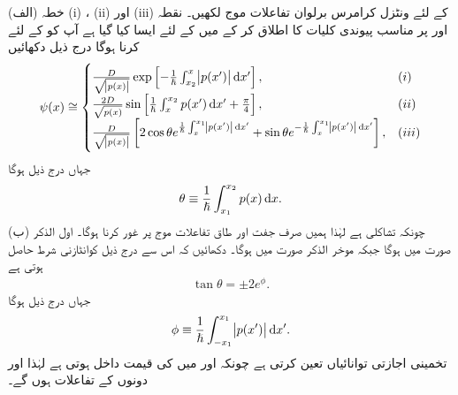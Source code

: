 (الف) خطہ (i) ، (ii)  اور (iii)  کے لئے ونٹزل کرامرس برلوان تفاعلات موج لکھیں۔ نقطہ  اور  پر مناسب پیوندی کلیات کا اطلاق کر کے  میں  کے لئے ایسا کیا گیا ہے آپ کو  کے لئے کرنا ہوگا درج ذیل دکھائیں
\begin{align*}
	\psi(x)\cong
	\begin{cases}
		\frac{D}{\sqrt{\abs{p(x)}}} \exp\left[-\frac{1}{\hslash}\int^{x}_{x_{2}}\abs{p(x')}\dif x'\right],& (i) \\
		\frac{2D}{\sqrt{p(x)}} \sin\left[\frac{1}{\hslash}\int^{x_{2}}_{x}p(x')\dif x'+\frac{\pi}{4}\right],& (ii) \\
		\frac{D}{\sqrt{\abs{p(x)}}}\left[2 \cos\theta e^{\frac{1}{\hslash}\int^{x_{1}}_{x}\abs{p(x')}\dif x'} +\sin\theta e^{-\frac{1}{\hslash}\int^{x_{1}}_{x}\abs{p(x')}\dif x'}\right],& (iii)
	\end{cases}
\end{align*}
جہاں درج ذیل ہوگا
\begin{align}
	\theta\equiv\frac{1}{\hslash}\int^{x_{2}}_{x_{1}}p(x)\dif  x.
\end{align}
(ب) چونکہ  تشاکلی ہے لہٰذا ہمیں صرف جفت  اور طاق  تفاعلات موج پر غور کرنا ہوگا۔ اول الذکر صورت میں  ہوگا جبکہ موخر الذکر صورت میں  ہوگا۔ دکھائیں کہ اس سے درج ذیل کوانٹازنی شرط حاصل ہوتی ہے
\begin{align}
	\tan\theta=\pm 2e^{\phi}.
\end{align}
جہاں درج ذیل ہوگا
\begin{align}
	\phi\equiv\frac{1}{\hslash}\int^{x_{1}}_{-x_{1}}\abs{p(x')}\dif x'.
\end{align}
 تخمینی اجازتی توانائیاں تعین کرتی ہے چونکہ  اور  میں  کی قیمت داخل ہوتی ہے لہٰذا  اور  دونوں  کے تفاعلات ہوں گے۔


